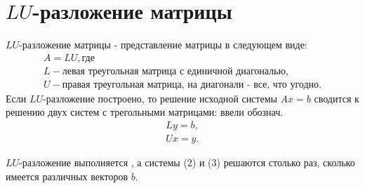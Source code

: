 \documentclass[a4paper,11pt]{article}
\begin{document}
\section{$LU$-разложение матрицы}
$LU$-разложение матрицы - представление матрицы в следующем виде:
\begin{gather*}
  A = LU, \text{где} \\
  L - \text{левая треугольная матрица с единичной диагональю}, \\
  U - \text{правая треугольная матрица, на диагонали - все, что угодно}.
\end{gather*}
Если $LU$-разложение построено, то решение исходной системы $Ax=b$ сводится к решению двух систем с трегольными матрицами:
\marginpar
{
  \vspace{11mm}
  \footnotesize ввели обознач.
}
\begin{gather}
  Ly=b, \\ Ux=y.
\end{gather}

$LU$-разложение выполняется , а системы (2) и (3) решаются столько раз, сколько имеется различных векторов $b$. \\
\end{document}
